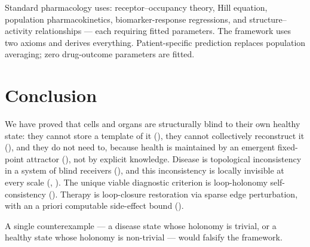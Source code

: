 \documentclass[twocolumn,11pt,a4paper]{article}
\begin{document}
Standard pharmacology uses: receptor--occupancy theory, Hill equation,
population pharmacokinetics, biomarker-response regressions, and structure--activity
relationships --- each requiring fitted parameters. The framework uses two axioms and
derives everything. Patient-specific prediction replaces population averaging;
zero drug-outcome parameters are fitted.

\section{Conclusion}
\label{sec:conclusion}

We have proved that cells and organs are structurally blind to their own
healthy state: they cannot store a template of it (),
they cannot collectively reconstruct it (),
and they do not need to, because health is maintained by an emergent
fixed-point attractor (), not by
explicit knowledge. Disease is topological inconsistency in a system of
blind receivers (), and this inconsistency is
locally invisible at every scale (,
). The unique viable diagnostic criterion is
loop-holonomy self-consistency (). Therapy is loop-closure
restoration via sparse edge perturbation, with an a priori computable
side-effect bound ().

A single counterexample --- a disease state whose holonomy is trivial,
or a healthy state whose holonomy is non-trivial --- would falsify
the framework.



\end{document}
